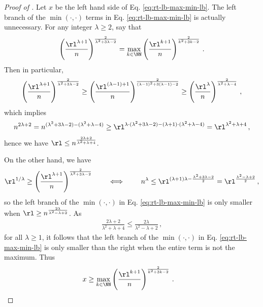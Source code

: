 \begin{proof}[Proof of ]
  Let $x$ be the left hand side of Eq. \ref{eq:rt-lb-max-min-lb}.
  The left branch of the $\min(\cdot,\cdot)$ terms in Eq. \ref{eq:rt-lb-max-min-lb} is actually unnecessary. For any integer $\lambda \ge 2$, say that
  \begin{align*}
    \left(\frac{\rl^{\lambda + 1}}{n}\right)^{\frac{2}{\lambda^2 + 3 \lambda - 2}} = \max_{k \in \NN} \left(\frac{\rl^{k + 1}}{n}\right)^{\frac{2}{k^2 + 3 k - 2}} \,.
  \end{align*}
  Then in particular,
  \begin{align*}
    \left(\frac{\rl^{\lambda + 1}}{n}\right)^{\frac{2}{\lambda^2 + 3 \lambda - 2}} \ge \left(\frac{\rl^{(\lambda -1) + 1}}{n}\right)^{\frac{2}{(\lambda-1)^2 + 3 (\lambda -1)- 2}} \ge     \left(\frac{\rl^{\lambda}}{n}\right)^{\frac{2}{\lambda^2 + \lambda - 4}} \,,
  \end{align*}
  which implies
  \begin{align*}
    n^{2 \lambda + 2} = n^{(\lambda^2 + 3 \lambda - 2) - (\lambda^2 + \lambda - 4)} \ge \rl^{\lambda \cdot (\lambda^2 + 3 \lambda - 2) - (\lambda + 1) \cdot (\lambda^2 + \lambda - 4)} = \rl^{\lambda^2 + \lambda + 4} \,,
  \end{align*}
  hence we have $\rl \le n^{\frac{2 \lambda +2}{\lambda^2 + \lambda + 4}}$. 

  On the other hand, we have
  \begin{align*}
    \rl^{1/\lambda} \ge \left(\frac{\rl^{\lambda + 1}}{n}\right)^{\frac{2}{\lambda^2 + 3 \lambda - 2}} \qquad \iff \qquad n^\lambda \le \rl^{(\lambda + 1) \lambda - \frac{\lambda^2+3\lambda - 2}{2}} = \rl^{\frac{\lambda^2 - \lambda + 2}{2}} \,,
  \end{align*}
  so the left branch of the $\min(\cdot,\cdot)$ in Eq. \ref{eq:rt-lb-max-min-lb} is only smaller when $\rl \ge n^{\frac{2 \lambda}{\lambda^2 - \lambda + 2}}$. As
  \begin{align*}
    \frac{2 \lambda +2}{\lambda^2 + \lambda + 4} \le \frac{2 \lambda}{\lambda^2 - \lambda + 2} \,,
  \end{align*}
  for all $\lambda \ge 1$, it follows that the left branch of the $\min(\cdot,\cdot)$ in Eq. \ref{eq:rt-lb-max-min-lb} is only smaller than the right when the entire term is not the maximum. Thus
  \begin{align*}
    x &\ge \max_{k \in \NN} \left(\frac{\rl^{k + 1}}{n}\right)^{\frac{2}{k^2 + 3 k - 2}} \,.
  \end{align*}


\end{proof}

